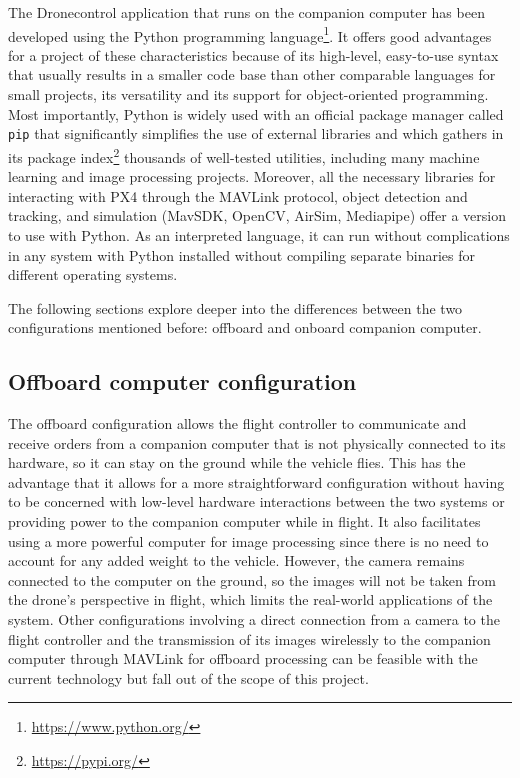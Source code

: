 The Dronecontrol application that runs on the companion computer has been developed using the Python programming language\footnote{\url{https://www.python.org/}}.
It offers good advantages for a project of these characteristics because of its high-level, easy-to-use syntax that usually results in a smaller code base than other comparable languages for small projects, its versatility and its support for object-oriented programming.
Most importantly, Python is widely used with an official package manager called \texttt{pip} that significantly simplifies the use of external libraries and which gathers in its package index\footnote{\url{https://pypi.org/}} thousands of well-tested utilities,
including many machine learning and image processing projects.
Moreover, all the necessary libraries for interacting with PX4 through the MAVLink protocol, object detection and tracking, and simulation (MavSDK, OpenCV, AirSim, Mediapipe) offer a version to use with Python.
As an interpreted language, it can run without complications in any system with Python installed without compiling separate binaries for different operating systems.

The following sections explore deeper into the differences between the two configurations mentioned before: offboard and onboard companion computer.

\subsection{Offboard computer configuration}
\label{subsec:offboard}

The offboard configuration allows the flight controller to communicate and receive orders from a companion computer that is not physically connected to its hardware, so it can stay on the ground while the vehicle flies.
This has the advantage that it allows for a more straightforward configuration without having to be concerned with low-level hardware interactions between the two systems or providing power to the companion computer while in flight.
It also facilitates using a more powerful computer for image processing since there is no need to account for any added weight to the vehicle.
However, the camera remains connected to the computer on the ground, so the images will not be taken from the drone's perspective in flight, which limits the real-world applications of the system.
Other configurations involving a direct connection from a camera to the flight controller and the transmission of its images wirelessly to the companion computer through MAVLink for offboard processing can be feasible with the current technology but fall out of the scope of this project.

